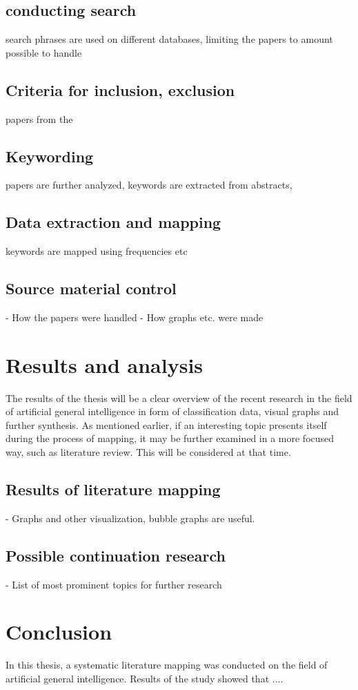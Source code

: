 \documentclass[utf8,english]{gradu3}
\begin{document}
\section{conducting search}
search phrases are used on different databases, limiting the papers to amount possible to handle

\section{Criteria for inclusion, exclusion}
papers from the 

\section{Keywording}
papers are further analyzed, keywords are extracted from abstracts, 

\section{Data extraction and mapping}
keywords are mapped using frequencies etc

\section{Source material control}
- How the papers were handled
- How graphs etc. were made

\chapter{Results and analysis}
The results of the thesis will be a clear overview of the recent research in the field of artificial general intelligence in form of classification data, visual graphs and further synthesis. As mentioned earlier, if an interesting topic presents itself during the process of mapping, it may be further examined in a more focused way, such as literature review. This will be considered at that time.

\section{Results of literature mapping}
- Graphs and other visualization, bubble graphs are useful.

\section{Possible continuation research}

- List of most prominent topics for further research

\chapter{Conclusion}
In this thesis, a systematic literature mapping was conducted on the field of artificial general intelligence. Results of the study showed that .... 

\printbibliography
\end{document}
